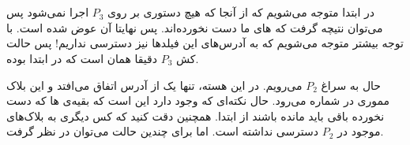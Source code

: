 \section{}
در ابتدا متوجه می‌شویم که از آنجا که هیچ دستوری بر روی
$P_3$
اجرا نمی‌شود پس می‌توان نتیچه گرفت که
های
ما دست نخورده‌اند. پس نهایتا
آن عوض شده است. با توجه بیشتر متوجه می‌شویم که به آدرس‌های این فیلد‌ها نیز دسترسی نداریم! پس حالت کش
$P_3$
دقیقا همان است که در ابتدا بوده.

حال به سراغ
$P_2$
می‌رویم. در این هسته، تنها یک
از آدرس
اتفاق می‌افتد و این بلاک مموری در شماره
می‌رود. حال نکته‌ای که وجود دارد این است که بقیه‌ی
ها
که دست نخورده باقی باید مانده باشند از ابتدا. همچنین دقت کنید که کس دیگری به بلاک‌های موجود در
$P_2$
دسترسی نداشته است. اما برای
چندین حالت می‌توان در نظر گرفت.
